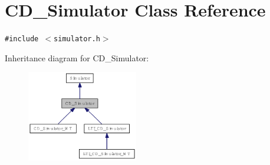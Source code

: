 \hypertarget{class_c_d___simulator}{
\section{CD\_\-Simulator Class Reference}
\label{class_c_d___simulator}
}
{\tt \#include $<$simulator.h$>$}

Inheritance diagram for CD\_\-Simulator:\nopagebreak
\begin{figure}[H]
\begin{center}
\leavevmode
\includegraphics[width=137pt]{class_c_d___simulator__inherit__graph}
\end{center}
\end{figure}
